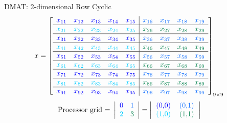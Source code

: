 \begin{frame}
\begin{exampleblock}{DMAT: 2-dimensional Row Cyclic}
\begin{align*}
x &= \left[
      \begin{array}{lllll|llll}
      \color{g11}x_{11} & \color{g11}x_{12} & \color{g11}x_{13} & 
\color{g11}x_{14} & \color{g11}x_{15} & \color{g12}x_{16} & \color{g12}x_{17} & 
\color{g12}x_{18} & \color{g12}x_{19}\\\hline
      \color{g13}x_{21} & \color{g13}x_{22} & \color{g13}x_{23} & 
\color{g13}x_{24} & \color{g13}x_{25} & \color{g21}x_{26} & \color{g21}x_{27} & 
\color{g21}x_{28} & \color{g21}x_{29}\\\hline
      \color{g11}x_{31} & \color{g11}x_{32} & \color{g11}x_{33} & 
\color{g11}x_{34} & \color{g11}x_{35} & \color{g12}x_{36} & \color{g12}x_{37} & 
\color{g12}x_{38} & \color{g12}x_{39}\\\hline
      \color{g13}x_{41} & \color{g13}x_{42} & \color{g13}x_{43} & 
\color{g13}x_{44} & \color{g13}x_{45} & \color{g21}x_{46} & \color{g21}x_{47} & 
\color{g21}x_{48} & \color{g21}x_{49}\\\hline
      \color{g11}x_{51} & \color{g11}x_{52} & \color{g11}x_{53} & 
\color{g11}x_{54} & \color{g11}x_{55} & \color{g12}x_{56} & \color{g12}x_{57} & 
\color{g12}x_{58} & \color{g12}x_{59}\\\hline
      \color{g13}x_{61} & \color{g13}x_{62} & \color{g13}x_{63} & 
\color{g13}x_{64} & \color{g13}x_{65} & \color{g21}x_{66} & \color{g21}x_{67} & 
\color{g21}x_{68} & \color{g21}x_{69}\\\hline
      \color{g11}x_{71} & \color{g11}x_{72} & \color{g11}x_{73} & 
\color{g11}x_{74} & \color{g11}x_{75} & \color{g12}x_{76} & \color{g12}x_{77} & 
\color{g12}x_{78} & \color{g12}x_{79}\\\hline
      \color{g13}x_{81} & \color{g13}x_{82} & \color{g13}x_{83} & 
\color{g13}x_{84} & \color{g13}x_{85} & \color{g21}x_{86} & \color{g21}x_{87} & 
\color{g21}x_{88} & \color{g21}x_{89}\\\hline
      \color{g11}x_{91} & \color{g11}x_{92} & \color{g11}x_{93} & 
\color{g11}x_{94} & \color{g11}x_{95} & \color{g12}x_{96} & \color{g12}x_{97} & 
\color{g12}x_{98} & \color{g12}x_{99}\\
      \end{array}
\right]_{9\times 9}
\end{align*}
\begin{align*}
\text{Processor grid = }\left|
      \begin{array}{ll}
      \color{g11}0 & \color{g12}1 \\
      \color{g13}2 & \color{g21}3
      \end{array}
\right| &= 
\left|
      \begin{tabular}{lll}
      \color{g11}(0,0) & \color{g12}(0,1) \\
      \color{g13}(1,0) & \color{g21}(1,1) 
      \end{tabular}
\right|
\end{align*}
\end{exampleblock}
\end{frame}




